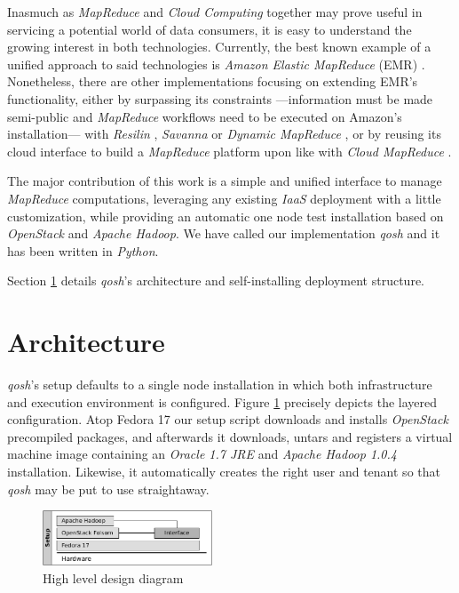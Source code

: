 \documentclass{sig-alternate}
\begin{document}
Inasmuch as \emph{MapReduce} and \emph{Cloud Computing} together may prove useful in servicing a potential world of data consumers, it is easy to understand the growing interest in both technologies. Currently, the best known example of a unified approach to said technologies is \emph{Amazon Elastic MapReduce} (EMR) \cite{emr:2013:online}. Nonetheless, there are other implementations focusing on extending EMR's functionality, either by surpassing its constraints ---information must be made semi-public and \emph{MapReduce} workflows need to be executed on Amazon's installation--- with \emph{Resilin} \cite{resilin}, \emph{Savanna} \cite{savanna:2013:online} or \emph{Dynamic MapReduce} \cite{dynamicmapreduce}, or by reusing its cloud interface to build a \emph{MapReduce} platform upon like with \emph{Cloud MapReduce} \cite{cloudmapreduce}.

The major contribution of this work is a simple and unified interface to manage \emph{MapReduce} computations, leveraging any existing \emph{IaaS} deployment with a little customization, while providing an automatic one node test installation based on \emph{OpenStack} and \emph{Apache Hadoop}. We have called our implementation \emph{qosh} and it has been written in \emph{Python}.

Section \ref{sec:arch} details \emph{qosh}'s architecture and self-installing deployment structure.



\section{Architecture}\label{sec:arch}
\noindent \emph{qosh}'s setup defaults to a single node installation in which both infrastructure and execution environment is configured. Figure \ref{fig:arch1} precisely depicts the layered configuration. Atop Fedora 17 our setup script downloads and installs \emph{OpenStack} precompiled packages, and afterwards it downloads, untars and registers a virtual machine image containing an \emph{Oracle 1.7 JRE} and \emph{Apache Hadoop 1.0.4} installation. Likewise, it automatically creates the right user and tenant so that \emph{qosh} may be put to use straightaway.

\begin{figure}[tbp]
\centering
\includegraphics[width=0.45\textwidth]{img/002}
\caption{High level design diagram}
\label{fig:arch1}
\end{figure}
\end{document}
